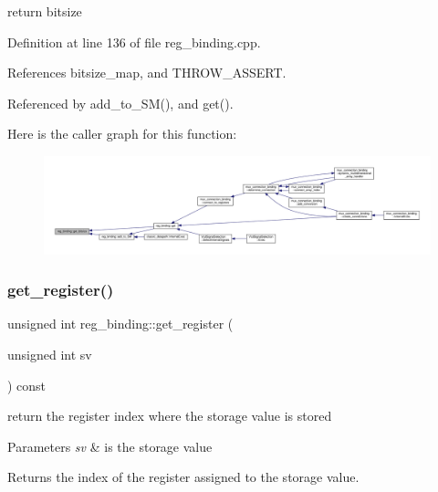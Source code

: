 return bitsize 



Definition at line 136 of file reg\+\_\+binding.\+cpp.



References bitsize\+\_\+map, and T\+H\+R\+O\+W\+\_\+\+A\+S\+S\+E\+RT.



Referenced by add\+\_\+to\+\_\+\+S\+M(), and get().

Here is the caller graph for this function\+:
\nopagebreak
\begin{figure}[H]
\begin{center}
\leavevmode
\includegraphics[width=350pt]{da/d7c/classreg__binding_a0cabf46fc41f3e673c810459e728b41c_icgraph}
\end{center}
\end{figure}
\mbox{\label{classreg__binding_a3bcf2f1b1510f1c719a8e38667551f60}} 
\subsubsection{\texorpdfstring{get\+\_\+register()}{get\_register()}}
{\footnotesize\ttfamily unsigned int reg\+\_\+binding\+::get\+\_\+register (\begin{DoxyParamCaption}\item[{unsigned int}]{sv }\end{DoxyParamCaption}) const\hspace{0.3cm}{\ttfamily [inline]}}



return the register index where the storage value is stored 


\begin{DoxyParams}{Parameters}
{\em sv} & is the storage value \\
\hline
\end{DoxyParams}
\begin{DoxyReturn}{Returns}
the index of the register assigned to the storage value. 
\end{DoxyReturn}


